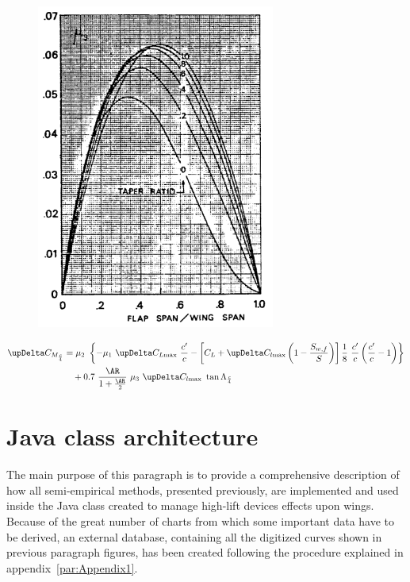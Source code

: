 \begin{figure}[!t]
\begin{minipage}{.5\textwidth}
\centering
\includegraphics[width=0.94\linewidth]{Mu3_Pitching_Moment}
\label{fig:Mu3}
\end{minipage}
\end{figure}
%
\begin{equation}
\begin{split}
\upDelta C_{M_{\frac{c}{4}}}&=\mu_2\ \left\{-\mu_1\ \upDelta C_{L\text{max}}\ \dfrac{c'}{c}-\left[C_L+\upDelta C_{l\text{max}}\left(1-\dfrac{S_{w,f}}{S}\right)\right]\dfrac{1}{8}\ \dfrac{c'}{c}\left(\dfrac{c'}{c}-1\right)\right\}\\
&\quad+0.7\ \dfrac{\AR}{1+\frac{\AR}{2}}\ \mu_3\ \upDelta C_{l\text{max}}\ \tan\Lambda_{\frac{c}{4}}
\label{eqn:DeltaCMPractical}
\end{split}
\end{equation}
%
\section{Java class architecture}
\label{par:CalcHighLiftDevices}
The main purpose of this paragraph is to provide a comprehensive description of how all semi-empirical methods, presented previously, are implemented and used inside the Java class created to manage high-lift devices effects upon wings. Because of the great number of charts from which some important data have to be derived, an external database, containing all the digitized curves shown in previous paragraph figures, has been created following the procedure explained in appendix~\ref{par:Appendix1}.


